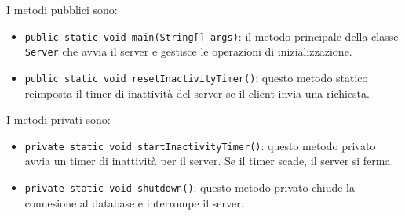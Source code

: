 I metodi pubblici sono:
\begin{itemize}
      \item \texttt{public static void main(String[] args)}: il metodo principale della classe \texttt{Server} che avvia il server e gestisce le operazioni di inizializzazione.
      \item \texttt{public static void resetInactivityTimer()}: questo metodo statico reimposta il timer di inattività del server se il client invia una richiesta.
\end{itemize}
I metodi privati sono:
\begin{itemize}
      \item \texttt{private static void startInactivityTimer()}: questo metodo privato avvia un timer di inattività per il server. Se il timer scade, il server si ferma.
      \item \texttt{private static void shutdown()}: questo metodo privato chiude la connesione al database e interrompe il server.
\end{itemize}


